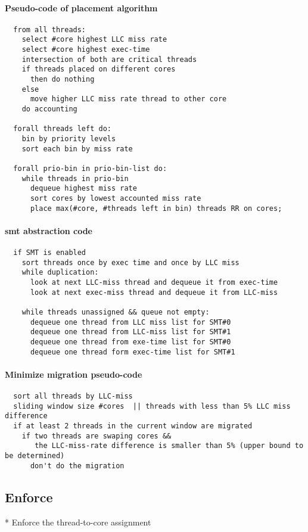   \paragraph{Pseudo-code of placement algorithm}
  \begin{verbatim}
  from all threads:
    select #core highest LLC miss rate
    select #core highest exec-time
    intersection of both are critical threads
    if threads placed on different cores
      then do nothing
    else
      move higher LLC miss rate thread to other core
    do accounting

  forall threads left do:
    bin by priority levels
    sort each bin by miss rate

  forall prio-bin in prio-bin-list do:
    while threads in prio-bin
      dequeue highest miss rate
      sort cores by lowest accounted miss rate
      place max(#core, #threads left in bin) threads RR on cores;
  \end{verbatim}

  \paragraph{\gls{smt} abstraction code}
  \begin{verbatim}
  if SMT is enabled
    sort threads once by exec time and once by LLC miss
    while duplication:
      look at next LLC-miss thread and dequeue it from exec-time
      look at next exec-miss thread and dequeue it from LLC-miss

    while threads unassigned && queue not empty:
      dequeue one thread from LLC miss list for SMT#0
      dequeue one thread from LLC-miss list for SMT#1
      dequeue one thread from exe-time list for SMT#0
      dequeue one thread form exec-time list for SMT#1
  \end{verbatim}

  \paragraph{Minimize migration pseudo-code}
  \begin{verbatim}
  sort all threads by LLC-miss
  sliding window size #cores  || threads with less than 5% LLC miss difference
  if at least 2 threads in the current window are migrated
    if two threads are swaping cores &&
       the LLC-miss-rate difference is smaller than 5% (upper bound to be determined)
      don't do the migration
  \end{verbatim}

\subsection{Enforce}

  * Enforce the thread-to-core assignment


